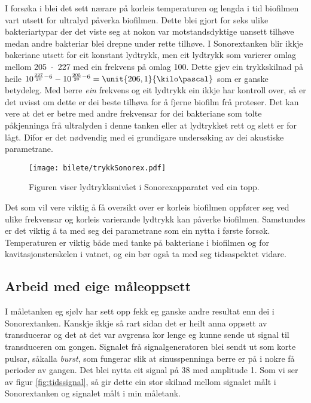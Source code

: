 I forsøka i \cite{ultraprotese} blei det sett nærare på korleis temperaturen og lengda i tid biofilmen vart utsett for ultralyd påverka biofilmen. Dette blei gjort for seks ulike bakteriartypar der det viste seg at nokon var motstandsdyktige uansett tilhøve medan andre bakteriar blei drepne under rette tilhøve. I Sonorextanken blir ikkje bakeriane utsett for eit konstant lydtrykk, men eit lydtrykk som varierer omlag mellom \unit{205 - 227}{\deci\bel} med ein frekvens på omlag \unit{100}{\hertz}. Dette gjev ein trykkskilnad på heile $10^{\frac{227}{20}-6} - 10^{\frac{205}{20}-6} = \unit{206,1}{\kilo\pascal}$ som er ganske betydeleg. Med berre \emph{ein} frekvens og eit lydtrykk ein ikkje har kontroll over, så er det uvisst om dette er dei beste tilhøva for å fjerne biofilm frå proteser. Det kan vere at det er betre med andre frekvensar for dei bakteriane som tolte påkjenninga frå ultralyden i denne tanken eller at lydtrykket rett og slett er for lågt. Difor er det nødvendig med ei grundigare undersøking av dei akustiske parametrane.

\begin{figure}[htbp]
	\centering
	\texttt{[image: bilete/trykkSonorex.pdf]}
	\caption[Lydtrykksnivå i Sonorexapparat - lite utdrag]{Figuren viser lydtrykksnivået i Sonorexapparatet ved ein topp.}
	\label{fig:trykksonorex}
\end{figure}

Det som vil vere viktig å få oversikt over er korleis biofilmen oppfører seg ved ulike frekvensar og korleis varierande lydtrykk kan påverke biofilmen. Samstundes er det viktig å ta med seg dei parametrane som ein nytta i første forsøk. Temperaturen er viktig både med tanke på bakteriane i biofilmen og for kavitasjonsterskelen i vatnet, og ein bør også ta med seg tidsaspektet vidare.

\subsection{Arbeid med eige måleoppsett}
I måletanken eg sjølv har sett opp fekk eg ganske andre resultat enn dei i Sonorextanken. Kanskje ikkje så rart sidan det er heilt anna oppsett av transducerar og det at det var avgrensa kor lenge eg kunne sende ut signal til transduceren om gongen. Signalet frå signalgeneratoren blei sendt ut som korte pulsar, såkalla \emph{burst}, som fungerar slik at sinusspenninga berre er på i nokre få perioder av gangen. Det blei nytta eit signal på \unit{38}{\kilo\hertz} med amplitude \unit{1}{\volt}. Som vi ser av figur \ref{fig:tidssignal}, så gir dette ein stor skilnad mellom signalet målt i Sonorextanken og signalet målt i min måletank.

